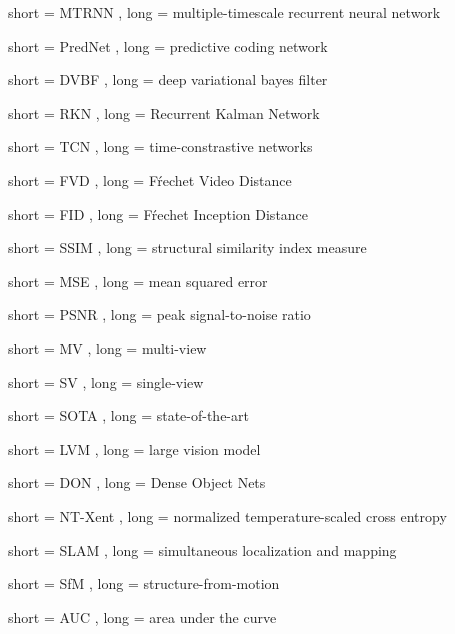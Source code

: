 


{
	short = MTRNN ,
	long = multiple-timescale recurrent neural network
}




{
	short = PredNet ,
	long = predictive coding network
}

{
	short = DVBF ,
	long = deep variational bayes filter
}

{
	short = RKN ,
	long = Recurrent Kalman Network
}

{
	short = TCN ,
	long = time-constrastive networks
}





{
	short = FVD ,
	long = Fŕechet Video Distance
}

{
	short = FID ,
	long = Fŕechet Inception Distance
}

{
	short = SSIM ,
	long = structural similarity index measure
}

{
	short = MSE ,
	long = mean squared error
}

{
	short = PSNR ,
	long = peak signal-to-noise ratio
}

{
	short = MV ,
	long = multi-view
}

{
	short = SV ,
	long = single-view
}

{
	short = SOTA ,
	long = state-of-the-art
}

{
	short = LVM ,
	long = large vision model
}

{
	short = DON ,
	long = Dense Object Nets
}

{
	short = NT-Xent ,
	long = normalized temperature-scaled cross entropy
}

{
	short = SLAM ,
	long = simultaneous localization and mapping 
}

{
	short = SfM ,
	long = structure-from-motion
}

{
	short = AUC ,
	long = area under the curve
}

